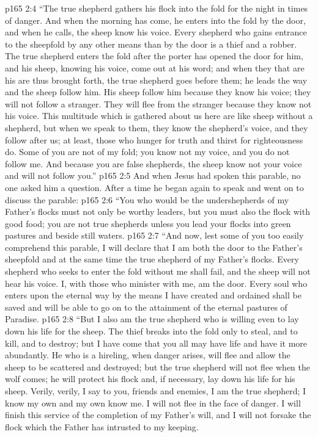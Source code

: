 \vs p165 2:4 \textcolor{ubdarkred}{“The true shepherd gathers his flock into the fold for the night in times of danger. And when the morning has come, he enters into the fold by the door, and when he calls, the sheep know his voice. Every shepherd who gains entrance to the sheepfold by any other means than by the door is a thief and a robber. The true shepherd enters the fold after the porter has opened the door for him, and his sheep, knowing his voice, come out at his word; and when they that are his are thus brought forth, the true shepherd goes before them; he leads the way and the sheep follow him. His sheep follow him because they know his voice; they will not follow a stranger. They will flee from the stranger because they know not his voice. This multitude which is gathered about us here are like sheep without a shepherd, but when we speak to them, they know the shepherd’s voice, and they follow after us; at least, those who hunger for truth and thirst for righteousness do. Some of you are not of my fold; you know not my voice, and you do not follow me. And because you are false shepherds, the sheep know not your voice and will not follow you.”}
\vs p165 2:5 \pc And when Jesus had spoken this parable, no one asked him a question. After a time he began again to speak and went on to discuss the parable:
\vs p165 2:6 \textcolor{ubdarkred}{“You who would be the undershepherds of my Father’s flocks must not only be worthy leaders, but you must also  the flock with good food; you are not true shepherds unless you lead your flocks into green pastures and beside still waters.}
\vs p165 2:7 \textcolor{ubdarkred}{“And now, lest some of you too easily comprehend this parable, I will declare that I am both the door to the Father’s sheepfold and at the same time the true shepherd of my Father’s flocks. Every shepherd who seeks to enter the fold without me shall fail, and the sheep will not hear his voice. I, with those who minister with me, am the door. Every soul who enters upon the eternal way by the means I have created and ordained shall be saved and will be able to go on to the attainment of the eternal pastures of Paradise.}
\vs p165 2:8 \textcolor{ubdarkred}{“But I also am the true shepherd who is willing even to lay down his life for the sheep. The thief breaks into the fold only to steal, and to kill, and to destroy; but I have come that you all may have life and have it more abundantly. He who is a hireling, when danger arises, will flee and allow the sheep to be scattered and destroyed; but the true shepherd will not flee when the wolf comes; he will protect his flock and, if necessary, lay down his life for his sheep. Verily, verily, I say to you, friends and enemies, I am the true shepherd; I know my own and my own know me. I will not flee in the face of danger. I will finish this service of the completion of my Father’s will, and I will not forsake the flock which the Father has intrusted to my keeping.}
